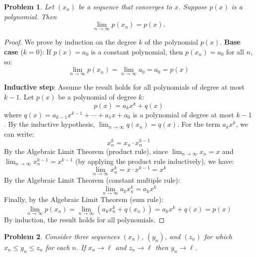 \documentclass[12pt]{article}
\newtheorem{problem}{Problem}
\begin{document}
\begin{problem} %
Let $(x_n)$ be a sequence that converges to $x$.  Suppose $p(x)$ is a polynomial.  Then
	$$\lim_{n\to\infty} p(x_n) = p(x).$$
\end{problem}


\begin{proof}
We prove by induction on the degree $k$ of the polynomial $p(x)$.
\newline
\textbf{Base case} ($k = 0$): If $p(x) = a_0$ is a constant polynomial, then $p(x_n) = a_0$ for all $n$, so:
$$\lim_{n\to\infty} p(x_n) = \lim_{n\to\infty} a_0 = a_0 = p(x)$$

\textbf{Inductive step}: Assume the result holds for all polynomials of degree at most $k-1$. Let $p(x)$ be a polynomial of degree $k$:
$$p(x) = a_k x^k + q(x)$$
where $q(x) = a_{k-1}x^{k-1} + \cdots + a_1 x + a_0$ is a polynomial of degree at most $k-1$.
\newline
By the inductive hypothesis, $\lim_{n\to\infty} q(x_n) = q(x)$.
\newline
For the term $a_k x^k$, we can write:
$$x_n^k = x_n \cdot x_n^{k-1}$$
\newline
By the Algebraic Limit Theorem (product rule), since $\lim_{n\to\infty} x_n = x$ and $\lim_{n\to\infty} x_n^{k-1} = x^{k-1}$ (by applying the product rule inductively), we have:
$$\lim_{n\to\infty} x_n^k = x \cdot x^{k-1} = x^k$$
\newline
By the Algebraic Limit Theorem (constant multiple rule):
$$\lim_{n\to\infty} a_k x_n^k = a_k x^k$$
\newline
Finally, by the Algebraic Limit Theorem (sum rule):
$$\lim_{n\to\infty} p(x_n) = \lim_{n\to\infty} (a_k x_n^k + q(x_n)) = a_k x^k + q(x) = p(x)$$
\newline
By induction, the result holds for all polynomials.
\end{proof}


\begin{problem} %
Consider three sequences $(x_n)$, $(y_n)$, and $(z_n)$ for which $x_n \le y_n \le z_n$ for each $n$.  If $x_n \to \ell$ and $z_n \to \ell$ then $y_n \to \ell$.
\end{problem}

\end{document}
